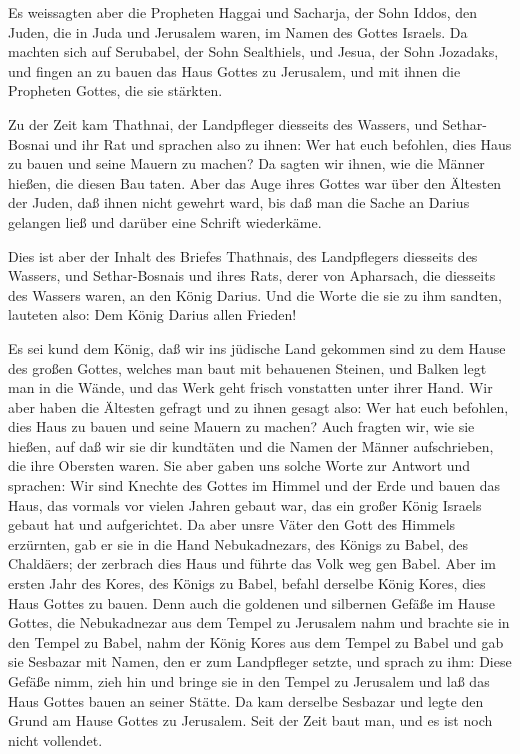  Es weissagten aber die Propheten Haggai und Sacharja, der
Sohn Iddos, den Juden, die in Juda und Jerusalem waren, im Namen des
Gottes Israels.  Da machten sich auf Serubabel, der Sohn
Sealthiels, und Jesua, der Sohn Jozadaks, und fingen an zu bauen das
Haus Gottes zu Jerusalem, und mit ihnen die Propheten Gottes, die sie
stärkten.

 Zu der Zeit kam Thathnai, der Landpfleger diesseits des
Wassers, und Sethar-Bosnai und ihr Rat und sprachen also zu ihnen: Wer
hat euch befohlen, dies Haus zu bauen und seine Mauern zu machen?
 Da sagten wir ihnen, wie die Männer hießen, die diesen Bau
taten.  Aber das Auge ihres Gottes war über den Ältesten der
Juden, daß ihnen nicht gewehrt ward, bis daß man die Sache an Darius
gelangen ließ und darüber eine Schrift wiederkäme.

 Dies ist aber der Inhalt des Briefes Thathnais, des
Landpflegers diesseits des Wassers, und Sethar-Bosnais und ihres Rats,
derer von Apharsach, die diesseits des Wassers waren, an den König
Darius.  Und die Worte die sie zu ihm sandten, lauteten
also: Dem König Darius allen Frieden!

 Es sei kund dem König, daß wir ins jüdische Land gekommen
sind zu dem Hause des großen Gottes, welches man baut mit behauenen
Steinen, und Balken legt man in die Wände, und das Werk geht frisch
vonstatten unter ihrer Hand.  Wir aber haben die Ältesten
gefragt und zu ihnen gesagt also: Wer hat euch befohlen, dies Haus zu
bauen und seine Mauern zu machen?  Auch fragten wir, wie
sie hießen, auf daß wir sie dir kundtäten und die Namen der Männer
aufschrieben, die ihre Obersten waren.  Sie aber gaben uns
solche Worte zur Antwort und sprachen: Wir sind Knechte des Gottes im
Himmel und der Erde und bauen das Haus, das vormals vor vielen Jahren
gebaut war, das ein großer König Israels gebaut hat und aufgerichtet.
 Da aber unsre Väter den Gott des Himmels erzürnten, gab er
sie in die Hand Nebukadnezars, des Königs zu Babel, des Chaldäers; der
zerbrach dies Haus und führte das Volk weg gen Babel.  Aber
im ersten Jahr des Kores, des Königs zu Babel, befahl derselbe König
Kores, dies Haus Gottes zu bauen.  Denn auch die goldenen
und silbernen Gefäße im Hause Gottes, die Nebukadnezar aus dem Tempel zu
Jerusalem nahm und brachte sie in den Tempel zu Babel, nahm der König
Kores aus dem Tempel zu Babel und gab sie Sesbazar mit Namen, den er zum
Landpfleger setzte,  und sprach zu ihm: Diese Gefäße nimm,
zieh hin und bringe sie in den Tempel zu Jerusalem und laß das Haus
Gottes bauen an seiner Stätte.  Da kam derselbe Sesbazar
und legte den Grund am Hause Gottes zu Jerusalem. Seit der Zeit baut
man, und es ist noch nicht vollendet.

